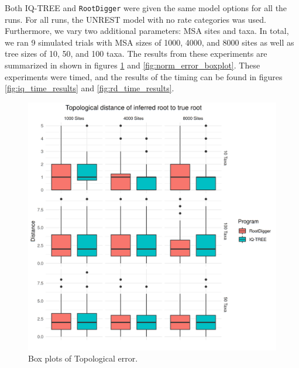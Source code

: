 \documentclass{article}
\newcommand{\RootDiggertt}{\texttt{RootDigger}}
\begin{document}
Both IQ-TREE and \RootDiggertt{} were given the same model options for all the
runs. For all runs, the UNREST model with no rate categories was used.
Furthermore, we vary two additional parameters: MSA sites and taxa. In total, we
ran 9 simulated trials with MSA sizes of 1000, 4000, and 8000 sites as well as
tree sizes of 10, 50, and 100 taxa.
The results from these experiments are summarized in shown in figures
\ref{fig:top_error_boxplot} and \ref{fig:norm_error_boxplot}.
These experiments were timed, and the results of the timing can be found in figures
\ref{fig:iq_time_results} and \ref{fig:rd_time_results}.

\begin{figure}
  \begin{center}
    \includegraphics[width=.9\linewidth]{./figs/sim_results/melted_dist_box.png}
    \caption{Box plots of Topological error.
    \label{fig:top_error_boxplot}}
\end{center}
\end{figure}
\end{document}
